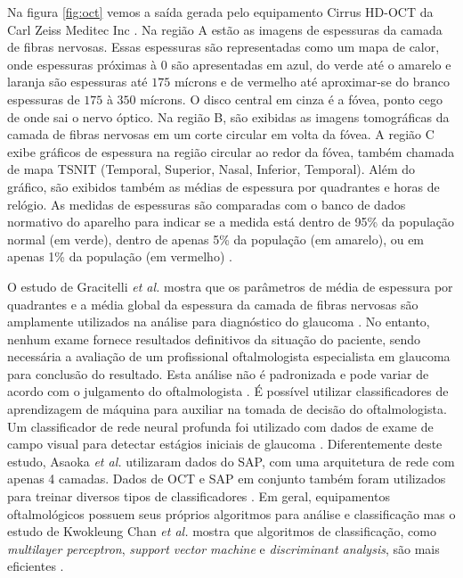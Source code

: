 \documentclass[conference]{IEEEtran}
\begin{document}
Na figura \ref{fig:oct} vemos a saída gerada pelo equipamento Cirrus HD-OCT da Carl Zeiss Meditec Inc \cite{zeiss}. Na região A estão as imagens de espessuras da camada de fibras nervosas. Essas espessuras são representadas como um mapa de calor, onde espessuras próximas à $0$ são apresentadas em azul, do verde até o amarelo e laranja são espessuras até $175$ mícrons e de vermelho até aproximar-se do branco espessuras de $175$ à $350$ mícrons. O disco central em cinza é a fóvea, ponto cego de onde sai o nervo óptico. Na região B, são exibidas as imagens tomográficas da camada de fibras nervosas em um corte circular em volta da fóvea. A região C exibe gráficos de espessura na região circular ao redor da fóvea, também chamada de mapa TSNIT (Temporal, Superior, Nasal, Inferior, Temporal). Além do gráfico, são exibidos também as médias de espessura por quadrantes e horas de relógio. As medidas de espessuras são comparadas com o banco de dados normativo do aparelho para indicar se a medida está dentro de 95\% da população normal (em verde), dentro de apenas 5\% da população (em amarelo), ou em apenas 1\% da população (em vermelho) \cite{aref2010}. 

O estudo de Gracitelli \textit{et al.} mostra que os parâmetros de média de espessura por quadrantes e a média global da espessura da camada de fibras nervosas são amplamente utilizados na análise para diagnóstico do glaucoma \cite{Gracitelli2015}. No entanto, nenhum exame fornece resultados definitivos da situação do paciente, sendo necessária a avaliação de um profissional oftalmologista especialista em glaucoma para conclusão do resultado. Esta análise não é padronizada e pode variar de acordo com o julgamento do oftalmologista \cite{kroese2003}. É possível utilizar classificadores de aprendizagem de máquina para auxiliar na tomada de decisão do oftalmologista. Um classificador de rede neural profunda foi utilizado com dados de exame de campo visual para detectar estágios iniciais de glaucoma \cite{Asaoka2016}. Diferentemente deste estudo, Asaoka \textit{et al.} utilizaram dados do SAP, com uma arquitetura de rede com apenas 4 camadas. Dados de OCT e SAP em conjunto também foram utilizados para treinar diversos tipos de classificadores \cite{bowd2008, silva2013}. Em geral, equipamentos oftalmológicos possuem seus próprios algoritmos para análise e classificação mas o estudo de Kwokleung Chan \textit{et al.} mostra que algoritmos de classificação, como \textit{multilayer perceptron}, \textit{support vector machine} e \textit{discriminant analysis}, são mais eficientes \cite{kwokleung2002}.
\end{document}
